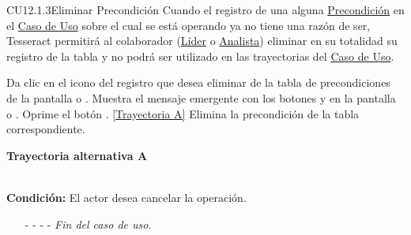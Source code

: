 	\begin{UseCase}{CU12.1.3}{Eliminar Precondición}{
			Cuando el registro de una  alguna \hyperlink{entidadPrecondicion}{Precondición} en el \hyperlink{casoUso}{Caso de Uso} sobre el cual se está operando ya no tiene una razón de ser, Tesseract permitirá al colaborador (\hyperlink{jefe}{Líder} o \hyperlink{analista}{Analista}) eliminar en su totalidad su registro de la tabla y no podrá ser utilizado en las trayectorias del \hyperlink{casoUso}{Caso de Uso}.
	}
\end{UseCase}
\begin{UCtrayectoria}
	\UCpaso[\UCactor] Da clic en el icono \eliminar del registro que desea eliminar de la tabla de precondiciones de la pantalla  o .
	\UCpaso[\UCsist] Muestra el mensaje emergente  con los botones  y  en la pantalla  o .
	\UCpaso[\UCactor] Oprime el botón . \hyperlink{CU12-1-3:TAA}{[Trayectoria A]}
	\UCpaso[\UCsist] Elimina la precondición de la tabla correspondiente.
\end{UCtrayectoria}		
\hypertarget{CU12-1-3:TAA}{\textbf{Trayectoria alternativa A}}\\
\noindent \textbf{Condición:} El actor desea cancelar la operación.
\begin{enumerate}
	\UCpaso[\UCactor] Solicita cancelar la operación oprimiendo el botón  de la pantalla .
	\UCpaso[\UCsist] Muestra la pantalla  o .
	\item[- -] - - {\em {Fin del caso de uso}}.%
\end{enumerate}



